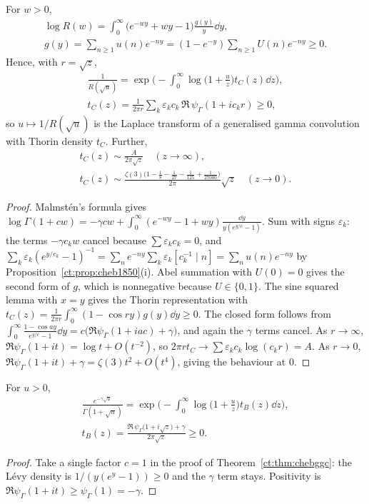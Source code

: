 \begin{theorem}\label{ct:thm:chebggc}
For $w>0$,
\begin{multline}\label{ct:eq:Rlevy}
\log R(w)=\int_0^\infty\big(e^{-wy}+wy-1\big)\frac{g(y)}{y}\dd y,\\
g(y)=\sum_{n\ge1}u(n)e^{-ny}=(1-e^{-y})\sum_{n\ge1}U(n)e^{-ny}\ge0.
\end{multline}
Hence, with $r=\sqrt z$,
\begin{multline*}
\frac1{R(\sqrt{u})}=\exp\Big(-\int_0^\infty\log\Big(1+\frac uz\Big)t_C(z)\dd z\Big),\\
t_C(z)=\frac{1}{2\pi r}\sum_k\varepsilon_kc_k\,\Re\,\psi_\Gamma(1+ic_kr)\ge0,
\end{multline*}
so $u\mapsto1/R(\sqrt u)$ is the Laplace transform of a generalised gamma convolution with Thorin density $t_C$. Further,
\begin{multline*}
t_C(z)\sim\frac{A}{2\pi\sqrt{z}}\quad(z\to\infty),\\
t_C(z)\sim\frac{\zeta(3)\big(1-\tfrac18-\tfrac1{27}-\tfrac1{125}+\tfrac1{27000}\big)}{2\pi}\sqrt{z}\quad(z\to0).
\end{multline*}
\end{theorem}

\begin{proof}
Malmst\'en's formula gives $\log\Gamma(1+cw)=-\gamma cw+\int_0^\infty(e^{-wy}-1+wy)\frac{\dd y}{y(e^{y/c}-1)}$. Sum with signs $\varepsilon_k$: the terms $-\gamma c_kw$ cancel because $\sum\varepsilon_kc_k=0$, and $\sum_k\varepsilon_k(e^{y/c_k}-1)^{-1}=\sum_ne^{-ny}\sum_k\varepsilon_k[c_k^{-1}\mid n]=\sum_nu(n)e^{-ny}$ by Proposition~\ref{ct:prop:cheb1850}(i). Abel summation with $U(0)=0$ gives the second form of $g$, which is nonnegative because $U\in\{0,1\}$. The sine squared lemma with $x=y$ gives the Thorin representation with $t_C(z)=\frac{1}{2\pi r}\int_0^\infty(1-\cos ry)g(y)\dd y\ge0$. The closed form follows from $\int_0^\infty\frac{1-\cos ay}{e^{y/c}-1}\dd y=c\big(\Re\psi_\Gamma(1+iac)+\gamma\big)$, and again the $\gamma$ terms cancel. As $r\to\infty$, $\Re\psi_\Gamma(1+it)=\log t+O(t^{-2})$, so $2\pi rt_C\to\sum\varepsilon_kc_k\log(c_kr)=A$. As $r\to0$, $\Re\psi_\Gamma(1+it)+\gamma=\zeta(3)t^2+O(t^4)$, giving the behaviour at $0$.
\end{proof}

\begin{corollary}\label{ct:cor:bondesson}
For $u>0$,
\begin{multline*}
\frac{e^{-\gamma\sqrt u}}{\Gamma(1+\sqrt u)}=\exp\Big(-\int_0^\infty\log\Big(1+\frac{u}{z}\Big)t_B(z)\dd z\Big),\\
t_B(z)=\frac{\Re\,\psi_\Gamma\big(1+i\sqrt{z}\big)+\gamma}{2\pi\sqrt{z}}\ge0.
\end{multline*}
\end{corollary}
\begin{proof}
Take a single factor $c=1$ in the proof of Theorem~\ref{ct:thm:chebggc}: the L\'evy density is $1/(y(e^y-1))\ge0$ and the $\gamma$ term stays. Positivity is $\Re\psi_\Gamma(1+it)\ge\psi_\Gamma(1)=-\gamma$.
\end{proof}

